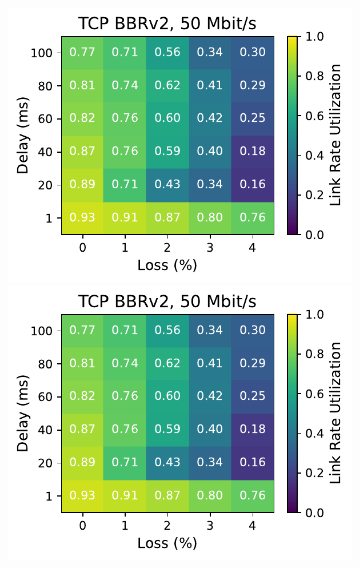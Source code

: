\begin{figure}[ht]
\begin{subfigure}[b]{1cm}
        \includegraphics[width=\linewidth,trim={8cm 0 0 0},clip]{figures/heatmaps/heatmap_tcp_bbr2_50mbps.pdf}
        \vspace*{0.22cm}
        \includegraphics[width=\linewidth,trim={8cm 0 0 0},clip]{figures/heatmaps/heatmap_tcp_bbr2_50mbps.pdf}
        \vspace*{0.22cm}

\end{subfigure}
\end{figure}
